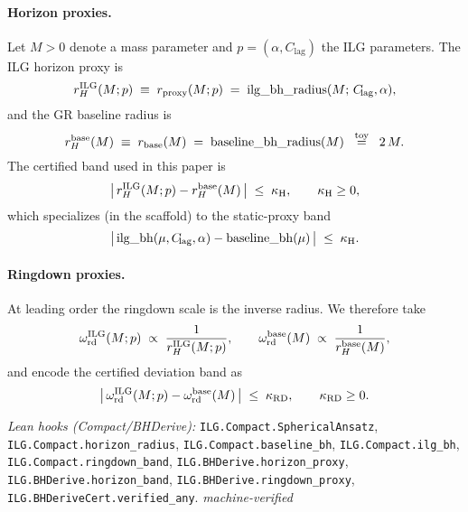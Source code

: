 \documentclass[12pt,a4paper]{article}
\begin{document}
\paragraph{Horizon proxies.}
Let \(M>0\) denote a mass parameter and \(p=(\alpha,C_{\!\mathrm{lag}})\) the ILG parameters. The ILG horizon proxy is
\begin{equation}
  r_H^{\rm ILG}(M;p) \;\equiv\; r_{\rm proxy}(M;p)
  \;=\; \mathrm{ilg\_bh\_radius}(M;\,C_{\!\mathrm{lag}},\alpha),
  \label{eq:ilg-horizon-proxy}
\end{equation}
and the GR baseline radius is
\begin{equation}
  r_H^{\rm base}(M) \;\equiv\; r_{\rm base}(M)
  \;=\; \mathrm{baseline\_bh\_radius}(M)
  \;\;\stackrel{\text{toy}}{=}\;\; 2\,M.
  \label{eq:baseline-horizon}
\end{equation}
The certified band used in this paper is
\begin{equation}
  \bigl|\,r_H^{\rm ILG}(M;p) - r_H^{\rm base}(M)\,\bigr| \;\le\; \kappa_{\rm H},
  \qquad \kappa_{\rm H}\ge 0,
  \label{eq:horizon-band-main}
\end{equation}
which specializes (in the scaffold) to the static-proxy band
\begin{equation}
  \bigl|\,\mathrm{ilg\_bh}( \mu, C_{\!\mathrm{lag}}, \alpha) - \mathrm{baseline\_bh}(\mu)\,\bigr| \;\le\; \kappa_{\rm H}.
  \label{eq:bh-static-band}
\end{equation}

\paragraph{Ringdown proxies.}
At leading order the ringdown scale is the inverse radius. We therefore take
\begin{equation}
  \omega_{\rm rd}^{\rm ILG}(M;p) \;\propto\; \frac{1}{r_H^{\rm ILG}(M;p)},
  \qquad
  \omega_{\rm rd}^{\rm base}(M) \;\propto\; \frac{1}{r_H^{\rm base}(M)},
  \label{eq:ringdown-proxies}
\end{equation}
and encode the certified deviation band as
\begin{equation}
  \bigl|\,\omega_{\rm rd}^{\rm ILG}(M;p) - \omega_{\rm rd}^{\rm base}(M)\,\bigr| \;\le\; \kappa_{\rm RD},
  \qquad \kappa_{\rm RD}\ge 0.
  \label{eq:ringdown-band}
\end{equation}

\noindent\emph{Lean hooks (Compact/BHDerive):}
\texttt{ILG.Compact.SphericalAnsatz}, \texttt{ILG.Compact.horizon\_radius}, 
\texttt{ILG.Compact.baseline\_bh}, \texttt{ILG.Compact.ilg\_bh}, 
\texttt{ILG.Compact.ringdown\_band}, 
\texttt{ILG.BHDerive.horizon\_proxy}, \texttt{ILG.BHDerive.horizon\_band}, 
\texttt{ILG.BHDerive.ringdown\_proxy}, \texttt{ILG.BHDeriveCert.verified\_any}. \emph{machine-verified}
\end{document}
